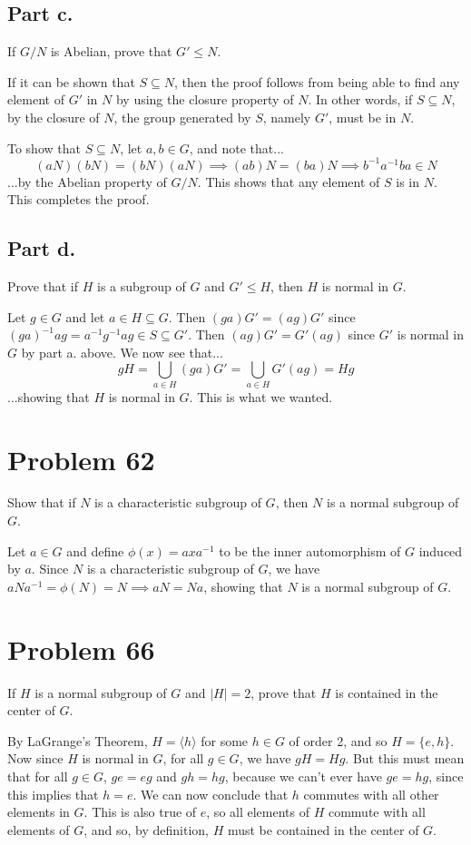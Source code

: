 \documentclass{article}
\begin{document}
\subsection*{Part c.}

If $G/N$ is Abelian, prove that $G'\leq N$.

If it can be shown that $S\subseteq N$, then the proof follows
from being able to find any element of $G'$ in $N$ by using the
closure property of $N$.  In other words, if $S\subseteq N$, by the closure
of $N$, the group generated by $S$, namely $G'$, must be in $N$.

To show that $S\subseteq N$, let $a,b\in G$, and note that...
\begin{equation*}
(aN)(bN)=(bN)(aN)\implies (ab)N=(ba)N\implies b^{-1}a^{-1}ba\in N
\end{equation*}
...by the Abelian property of $G/N$.  This shows that any element of
$S$ is in $N$.  This completes the proof.

\subsection*{Part d.}

Prove that if $H$ is a subgroup of $G$ and $G'\leq H$, then $H$ is normal in $G$.

Let $g\in G$ and let $a\in H\subseteq G$.
Then $(ga)G' = (ag)G'$ since $(ga)^{-1}ag = a^{-1}g^{-1}ag\in S\subseteq G'$.
Then $(ag)G'=G'(ag)$ since $G'$ is normal in $G$ by part a. above.
We now see that...
\begin{equation*}
gH = \bigcup_{a\in H}(ga)G'=\bigcup_{a\in H}G'(ag)=Hg
\end{equation*}
...showing that $H$ is normal in $G$.  This is what we wanted.

\section*{Problem 62}

Show that if $N$ is a characteristic subgroup of $G$, then $N$ is a normal subgroup of $G$.

Let $a\in G$ and define $\phi(x)=axa^{-1}$ to be the inner automorphism of $G$ induced by $a$.
Since $N$ is a characteristic subgroup of $G$, we have $aNa^{-1}=\phi(N)=N\implies aN=Na$,
showing that $N$ is a normal subgroup of $G$.

\section*{Problem 66}

If $H$ is a normal subgroup of $G$ and $|H|=2$, prove that $H$ is
contained in the center of $G$.

By LaGrange's Theorem, $H=\langle h\rangle$ for some $h\in G$ of order 2,
and so $H=\{e,h\}$.  Now since $H$ is normal in $G$, for all $g\in G$,
we have $gH=Hg$.  But this must mean that for all $g\in G$, $ge=eg$ and
$gh=hg$, because we can't ever have $ge=hg$, since this implies that $h=e$.
We can now conclude that $h$ commutes with all other elements in $G$.
This is also true of $e$, so all elements of $H$ commute with all elements
of $G$, and so, by definition, $H$ must be contained in the center of $G$.
\end{document}
